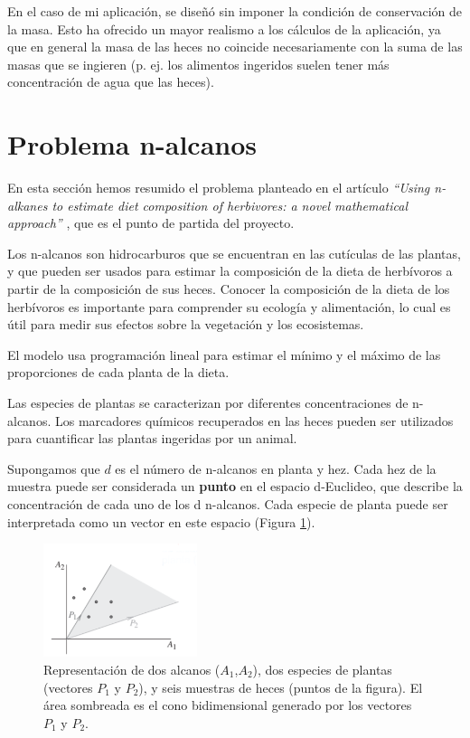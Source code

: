 
En el caso de mi aplicación, se diseñó sin imponer la condición de conservación de la masa. Esto ha ofrecido un mayor realismo a los cálculos de la aplicación, ya que en general la masa de las heces no coincide necesariamente con la suma de las masas que se ingieren (p. ej. los alimentos ingeridos suelen tener más concentración de agua que las heces).

\newpage
\section{Problema n-alcanos}

En esta sección hemos resumido el problema planteado en el artículo \emph{``Using n-alkanes to estimate diet composition of herbivores: a novel mathematical approach''} \cite{problemn-alkanes2007}, que es el punto de partida del proyecto.

Los n-alcanos son hidrocarburos que se encuentran en las cutículas de las plantas, y que pueden ser usados para estimar la composición de la dieta de herbívoros a partir de la composición de sus heces. Conocer la composición de la dieta de los herbívoros es importante para comprender su ecología y alimentación, lo cual es útil para medir sus efectos sobre la vegetación y los ecosistemas.

El modelo usa programación lineal para estimar el mínimo y el máximo de las proporciones de cada planta de la dieta.

Las especies de plantas se caracterizan por diferentes concentraciones de n-alcanos. Los marcadores químicos recuperados en las heces pueden ser utilizados para cuantificar las plantas ingeridas por un animal.
	
Supongamos que $d$ es el número de n-alcanos en planta y hez. Cada hez de la muestra puede ser considerada un \textbf{punto} en el espacio d-Euclideo, que describe la concentración de cada uno de los d n-alcanos. Cada especie de planta puede ser interpretada como un vector en este espacio (Figura \ref{fig:espacio01}).

\begin{figure}[h!] 
\centering
    \includegraphics[width=0.4\textwidth]{img/espacio01.png}
\caption{Representación de dos alcanos ($A_1$,$A_2$), dos especies de plantas (vectores $P_1$ y $P_2$), y seis muestras de heces (puntos de la figura). El área sombreada es el cono bidimensional generado por los vectores $P_1$ y $P_2$.}
\label{fig:espacio01}
\end{figure}


